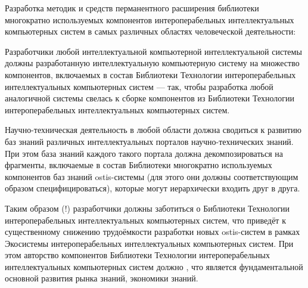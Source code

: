 \begin{textitemize}
	Разработка методик и средств перманентного расширения библиотеки многократно используемых компонентов интероперабельных интеллектуальных компьютерных систем в самых различных областях человеческой деятельности:
	\begin{textitemize}
		\item Разработчики любой интеллектуальной компьютерной интеллектуальной системы должны   разработанную интеллектуальную компьютерную систему на множество компонентов, включаемых в состав Библиотеки Технологии интероперабельных интеллектуальных компьютерных систем --- так, чтобы разработка любой аналогичной системы свелась к сборке компонентов из Библиотеки Технологии интероперабельных интеллектуальных компьютерных систем.
		\item Научно-техническая деятельность в любой области должна сводиться к развитию баз знаний различных интеллектуальных порталов научно-технических знаний. При этом база знаний каждого такого портала должна декомпозироваться на фрагменты, включаемые в состав Библиотеки многократно используемых компонентов баз знаний ostis-системы (для этого они должны соответствующим образом специфицироваться), которые могут иерархически входить друг в друга.
		\item Таким образом (!) разработчики должны заботиться о  Библиотеки Технологии интероперабельных интеллектуальных компьютерных систем, что приведёт к существенному снижению трудоёмкости разработки новых ostis-систем в рамках Экосистемы интероперабельных интеллектуальных компьютерных систем. При этом авторство компонентов Библиотеки Технологии интероперабельных интеллектуальных компьютерных систем должно , что является фундаментальной основной развития рынка знаний, экономики знаний.  
	\end{textitemize}
	\vspace{-1\baselineskip}

\end{textitemize}
